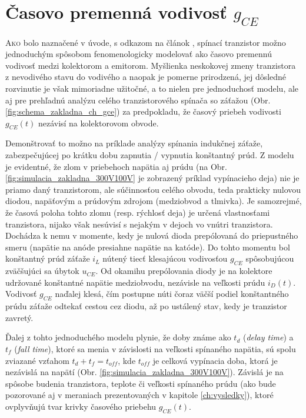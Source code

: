 \chapter{Časovo premenná vodivosť $g_{CE}$} \label{ch:gce}

\lettrine{A}{ko} bolo naznačené v úvode, s odkazom na článok \cite{valsa-patocka-petru}, spínací tranzistor možno jednoduchým spôsobom fenomenologicky  modelovať ako časovo premennú vodivosť medzi kolektorom a emitorom. Myšlienka neskokovej zmeny tranzistora z nevodivého stavu do vodivého a naopak je pomerne prirodzená, jej dôsledné rozvinutie je však mimoriadne užitočné, a to nielen pre jednoduchosť modelu, ale aj pre prehľadnú analýzu celého tranzistorového spínača so záťažou (Obr. \ref{fig:schema_zakladna_ch_gce}) za predpokladu, že časový priebeh vodivosti $g_{CE}(t)$ nezávisí na kolektorovom obvode. 


Demonštrovať to možno na príklade analýzy spínania indukčnej záťaže, zabezpečujúcej po krátku dobu zapnutia / vypnutia konštantný prúd.  Z modelu je evidentné, že zlom v priebehoch napätia aj prúdu (na Obr. \ref{fig:simulacia_zakladna_300V100V} je zobrazený príklad vypínacieho deja) nie je priamo daný tranzistorom, ale súčinnosťou celého obvodu, teda prakticky nulovou diodou, napäťovým a prúdovým zdrojom (medziobvod a tlmivka). Je samozrejmé, že časová poloha tohto zlomu (resp. rýchlosť deja) je určená vlastnosťami tranzistora, nijako však nesúvisí s nejakým  v dejoch vo vnútri tranzistora. Dochádza k nemu v momente, kedy je nulová dioda prepólovaná do priepustného smeru (napätie na anóde presiahne napätie na katóde). Do tohto momentu bol konštantný prúd záťaže $i_L$ nútený tiecť klesajúcou vodivosťou $g_{CE}$ spôsobujúcou zväčšujúci sa úbytok $u_{CE}$. Od okamihu prepólovania diody je na kolektore udržované konštantné napätie medziobvodu, nezávisle na veľkosti prúdu $i_D(t)$. Vodivosť $g_{CE}$ naďalej klesá, čím postupne núti čoraz väčší podiel konštantného prúdu záťaže odtekať cestou cez diodu, až po ustálený stav, kedy je tranzistor zavretý.


Ďalej z tohto jednoduchého modelu plynie, že doby známe ako $t_d$ (\textit{delay time}) a $t_f$ (\textit{fall time}), ktoré sa menia v závislosti na veľkosti spínaného napätia, sú spolu zviazané vzťahom $t_d + t_f = t_{off}$, kde $t_{off}$ je celková vypínacia doba, ktorá je nezávislá na napätí (Obr. \ref{fig:simulacia_zakladna_300V100V}). Závislá je na spôsobe budenia tranzistora, teplote či veľkosti spínaného prúdu (ako bude pozorované aj v meraniach prezentovaných v kapitole \ref{ch:vysledky}), ktoré ovplyvňujú tvar krivky časového priebehu $g_{CE}(t)$.

